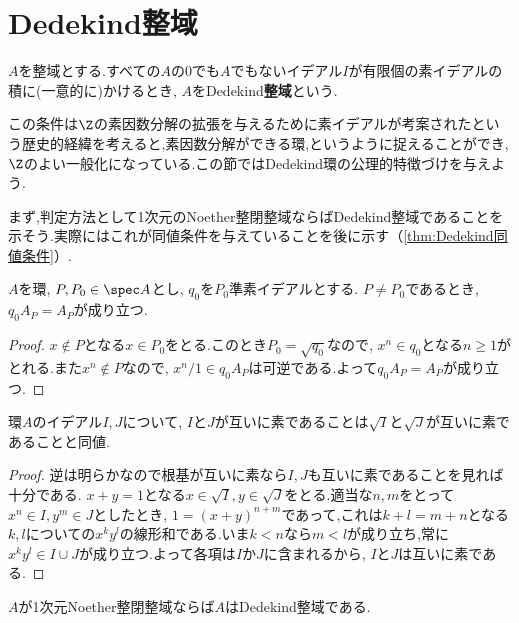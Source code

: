 \section{Dedekind整域}

\begin{defi}[Dedekind整域]
	$A$を整域とする.すべての$A$の0でも$A$でもないイデアル$I$が有限個の素イデアルの積に(一意的に)かけるとき, $A$をDedekind\textbf{整域}という.
\end{defi}

この条件は$\Z$の素因数分解の拡張を与えるために素イデアルが考案されたという歴史的経緯を考えると,素因数分解ができる環,というように捉えることができ, $\Z$のよい一般化になっている.この節ではDedekind環の公理的特徴づけを与えよう.

まず,判定方法として1次元のNoether整閉整域ならばDedekind整域であることを示そう.実際にはこれが同値条件を与えていることを後に示す（\ref{thm:Dedekind同値条件}）.

\begin{lem}\label{lem:Dedekind-1}
	$A$を環, $P,P_0\in\spec A$とし, $
	q_0$を$P_0$準素イデアルとする. $P\neq P_0$であるとき, $q_0A_P=A_P$が成り立つ.
\end{lem}

\begin{proof}
	$x\not\in P$となる$x\in P_0$をとる.このとき$P_0=\sqrt{q_0}$なので, $x^n\in q_0$となる$n\geq1$がとれる.また$x^n\not\in P$なので, $x^n/1\in q_0A_P$は可逆である.よって$q_0A_P=A_P$が成り立つ.
\end{proof}

\begin{lem}\label{lem:Dedekind-2}
	環$A$のイデアル$I,J$について, $I$と$J$が互いに素であることは$\sqrt{I}$と$\sqrt{J}$が互いに素であることと同値.
\end{lem}

\begin{proof}
	逆は明らかなので根基が互いに素なら$I,J$も互いに素であることを見れば十分である. $x+y=1$となる$x\in\sqrt{I},y\in\sqrt{J}$をとる.適当な$n,m$をとって$x^n\in I,y^m\in J$としたとき, $1=(x+y)^{n+m}$であって,これは$k+l=m+n$となる$k,l$についての$x^ky^l$の線形和である.いま$k<n$なら$m<l$が成り立ち,常に$x^ky^l\in I\cup J$が成り立つ.よって各項は$I$か$J$に含まれるから, $I$と$J$は互いに素である.
\end{proof}

\begin{thm}\label{thm:1dimNoether整閉整域ならDedekind}
	$A$が1次元Noether整閉整域ならば$A$はDedekind整域である.
\end{thm}

